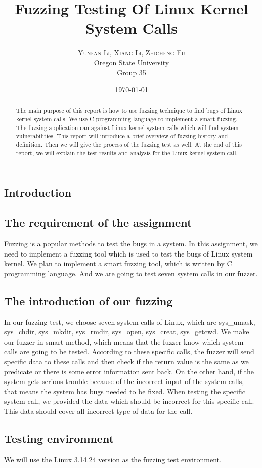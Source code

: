 \documentclass[twoside]{article}
\title{\vspace{-20mm}\fontsize{22pt}{10pt}\selectfont\textbf{Fuzzing Testing Of Linux Kernel System Calls}
  \fontsize{15pt}{6pt}\selectfont\textbf {}
  } %
\author{
  \large
  \textsc{Yunfan Li, Xiang Li, Zhicheng Fu}\\ %
  \normalsize Oregon State University \\ %
  \normalsize \href{mailto:liyunf@onid.oregonstate.edu, lix6@onid.oregonstate.edu, fuz@onid.oregonstate.edu}{Group 35}
  \vspace{-2mm}
  }
\date{\today}
\begin{document}
\maketitle
\begin{abstract}
  The main purpose of this report is how to use fuzzing technique to find bugs of Linux kernel system calls. We use C programming language to implement a smart fuzzing. The fuzzing application can against Linux kernel system calls which will find system vulnerabilities. This report will introduce a brief overview of fuzzing history and definition. Then we will give the process of the fuzzing test as well. At the end of this report, we will explain the test results and analysis for the Linux kernel system call.
\end{abstract}
\begin{multicols}{2}
\section{Introduction}
\subsection{The requirement of the assignment}
Fuzzing is a popular methods to test the bugs in a system. In this assignment, we need to implement a fuzzing tool which is used to test the bugs of Linux system kernel. We plan to implement a smart fuzzing tool, which is written by C programming language. And we are going to test seven system calls in our fuzzer.
\subsection{The introduction of our fuzzing}
In our fuzzing test, we choose seven system calls of Linux, which are sys\_umask, sys\_chdir, sys\_mkdir, sys\_rmdir, sys\_open, sys\_creat, sys\_getcwd. We make our fuzzer in smart method, which means that the fuzzer know which system calls are going to be tested. According to these specific calls, the fuzzer will send specific data to these calls and then check if the return value is the same as we predicate or there is some error information sent back. On the other hand, if the system gets serious trouble because of the incorrect input of the system calls, that means the system has bugs needed to be fixed. When testing the specific system call, we provided the data which should be incorrect for this specific call. This data should cover all incorrect type of data for the call.
\subsection{Testing environment}
We will use the Linux 3.14.24 version as the fuzzing test environment.

\end{multicols}
\end{document}
